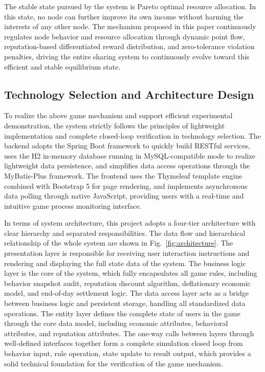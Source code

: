 \documentclass[conference,letterpaper]{IEEEtran}
\begin{document}
The stable state pursued by the system is Pareto optimal resource allocation. In this state, no node can further improve its own income without harming the interests of any other node. The mechanism proposed in this paper continuously regulates node behavior and resource allocation through dynamic point flow, reputation-based differentiated reward distribution, and zero-tolerance violation penalties, driving the entire sharing system to continuously evolve toward this efficient and stable equilibrium state.

\subsection{Technology Selection and Architecture Design}

To realize the above game mechanism and support efficient experimental demonstration, the system strictly follows the principles of lightweight implementation and complete closed-loop verification in technology selection. The backend adopts the Spring Boot framework to quickly build RESTful services, uses the H2 in-memory database running in MySQL-compatible mode to realize lightweight data persistence, and simplifies data access operations through the MyBatis-Plus framework. The frontend uses the Thymeleaf template engine combined with Bootstrap 5 for page rendering, and implements asynchronous data polling through native JavaScript, providing users with a real-time and intuitive game process monitoring interface.

In terms of system architecture, this project adopts a four-tier architecture with clear hierarchy and separated responsibilities. The data flow and hierarchical relationship of the whole system are shown in Fig.~\ref{fig:architecture}. The presentation layer is responsible for receiving user interaction instructions and rendering and displaying the full state data of the system. The business logic layer is the core of the system, which fully encapsulates all game rules, including behavior snapshot audit, reputation discount algorithm, deflationary economic model, and end-of-day settlement logic. The data access layer acts as a bridge between business logic and persistent storage, handling all standardized data operations. The entity layer defines the complete state of users in the game through the core data model, including economic attributes, behavioral attributes, and reputation attributes. The one-way calls between layers through well-defined interfaces together form a complete simulation closed loop from behavior input, rule operation, state update to result output, which provides a solid technical foundation for the verification of the game mechanism.
\end{document}
